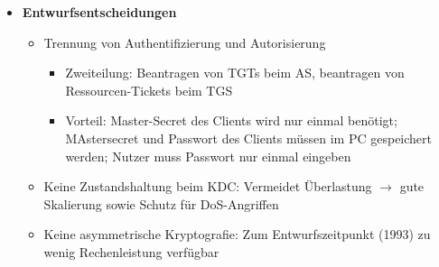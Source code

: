 \begin{itemize}
\begin{itemize}
	\end{itemize}
	\item \textbf{Entwurfsentscheidungen}
	\begin{itemize}
		\item Trennung von Authentifizierung und Autorisierung
		\begin{itemize}
			\item Zweiteilung: Beantragen von TGTs beim AS, beantragen von Ressourcen-Tickets beim TGS
			\item Vorteil: Master-Secret des Clients wird nur einmal benötigt; MAstersecret und Passwort des Clients müssen im PC gespeichert werden; Nutzer muss Passwort nur einmal eingeben
		\end{itemize}
		\item Keine Zustandshaltung beim KDC: Vermeidet Überlastung \(\rightarrow\) gute Skalierung sowie Schutz für DoS-Angriffen
		\item Keine asymmetrische Kryptografie: Zum Entwurfszeitpunkt (1993) zu wenig Rechenleistung verfügbar
	\end{itemize}
\end{itemize}



